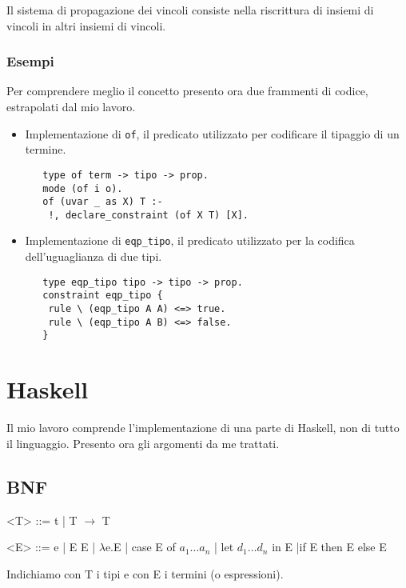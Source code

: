 \documentclass[12pt,a4paper,openright,twoside]{report}
\begin{document}
Il sistema di propagazione dei vincoli consiste nella riscrittura di insiemi di vincoli in altri insiemi di vincoli.

\subsubsection{Esempi}
Per comprendere meglio il concetto presento ora due frammenti di codice, estrapolati dal mio lavoro.\\
\begin{itemize}
 \item Implementazione di \verb"of", il predicato utilizzato per codificare il tipaggio di un termine.
  \begin{verbatim}
   type of term -> tipo -> prop.
   mode (of i o).
   of (uvar _ as X) T :-
    !, declare_constraint (of X T) [X].
  \end{verbatim}
 \item Implementazione di \verb"eqp_tipo", il predicato utilizzato per la codifica dell'uguaglianza di due tipi.
  \begin{verbatim}
   type eqp_tipo tipo -> tipo -> prop.
   constraint eqp_tipo {
    rule \ (eqp_tipo A A) <=> true.
    rule \ (eqp_tipo A B) <=> false.
   }
  \end{verbatim}
\end{itemize}

\section{Haskell}

Il mio lavoro comprende l'implementazione di una parte di Haskell, non di tutto il linguaggio. Presento ora gli argomenti da me trattati.

\subsection{BNF}
\begin{grammar}
 \let\syntleft\relax    %
 \let\syntright\relax   %
 <T> ::= t | T $\rightarrow$ T
 
 <E> ::= e | E E | $\lambda$e.E | case E of $a_1 \ldots a_n$ | let $d_1 \ldots d_n$ in E |if E then E else E
\end{grammar}
Indichiamo con T i tipi e con E i termini (o espressioni).
\end{document}
